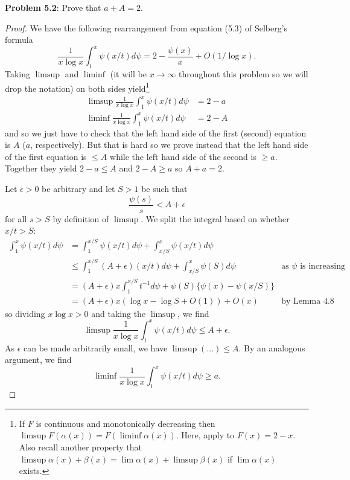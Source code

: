 \documentclass[12pt]{article}
\begin{document}
\fi

\textbf{Problem 5.2}: Prove that $a + A = 2$.

\begin{proof}
We have the following rearrangement from equation (5.3) of Selberg's formula
$$\frac{1}{x \log x} \int_1^x \psi(x/t) d\psi = 2 - \frac{\psi(x)}{x} + O(1/\log x).$$
Taking $\limsup$ and $\liminf$ (it will be $x \rightarrow \infty$ throughout this problem so we will drop the notation) on both sides yield\footnote{If $F$ is continuous and monotonically decreasing then $\limsup F(\alpha(x)) = F(\liminf \alpha(x))$. Here, apply to $F(x) = 2 - x$. Also recall another property that $\limsup \alpha(x) + \beta(x) = \lim \alpha(x) + \limsup \beta(x)$ if $\lim \alpha(x)$ exists.}
\begin{align*}
\limsup \frac{1}{x \log x} \int_1^x \psi(x/t) d\psi &= 2 - a\\
\liminf \frac{1}{x \log x} \int_1^x \psi(x/t) d\psi &= 2 - A
\end{align*}
and so we just have to check that the left hand side of the first (second) equation is $A$ ($a$, respectively). But that is hard so we prove instead that the left hand side of the first equation is $\leq A$ while the left hand side of the second is $\geq a$. Together they yield $2 - a \leq A$ and $2 - A \geq a$ so $A + a = 2$.

Let $\epsilon > 0$ be arbitrary and let $S > 1$ be such that
$$\frac{\psi(s)}{s} < A + \epsilon$$
for all $s > S$ by definition of $\limsup$. We split the integral based on whether $x/t > S$:
\begin{align*}
\int_1^x \psi(x/t) d\psi &= \int_1^{x/S} \psi(x/t) d\psi + \int_{x/S}^x \psi(x/t) d\psi\\
&\leq \int_1^{x/S} (A + \epsilon) (x/t) d\psi + \int_{x/S}^x \psi(S) d\psi &\text{as }\psi \text{ is increasing}\\
&= (A + \epsilon) x \int_1^{x/S} t^{-1} d\psi + \psi(S) \{\psi(x) - \psi(x/S)\}\\
&= (A + \epsilon) x (\log x - \log S + O(1)) + O(x) &\text{by Lemma 4.8}
\end{align*}
so dividing $x \log x > 0$ and taking the $\limsup$, we find
$$\limsup \frac{1}{x \log x} \int_1^x \psi(x/t) d\psi \leq A + \epsilon.$$
As $\epsilon$ can be made arbitrarily small, we have $\limsup (...) \leq A$. By an analogous argument, we find
$$\liminf \frac{1}{x \log x} \int_1^x \psi(x/t) d\psi \geq a.$$
\end{proof}

\unless\ifdefined\IsMainDocument
\end{document}

